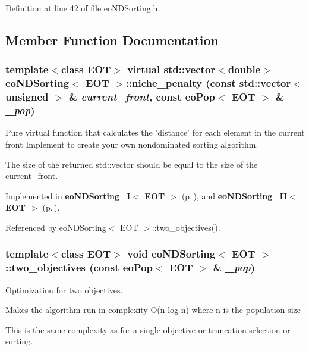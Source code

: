 Definition at line 42 of file eo\-NDSorting.h.

\subsection{Member Function Documentation}
\subsubsection{\setlength{\rightskip}{0pt plus 5cm}template$<$class EOT$>$ virtual std::vector$<$double$>$ {\bf eo\-NDSorting}$<$ {\bf EOT} $>$::niche\_\-penalty (const std::vector$<$ unsigned $>$ \& {\em current\_\-front}, const {\bf eo\-Pop}$<$ {\bf EOT} $>$ \& {\em \_\-pop})\hspace{0.3cm}{\tt  [pure virtual]}}\label{classeo_n_d_sorting_a2}


Pure virtual function that calculates the 'distance' for each element in the current front Implement to create your own nondominated sorting algorithm. 

The size of the returned std::vector should be equal to the size of the current\_\-front. 

Implemented in {\bf eo\-NDSorting\_\-I$<$ EOT $>$} {\rm (p.\,\pageref{classeo_n_d_sorting___i_a1})}, and {\bf eo\-NDSorting\_\-II$<$ EOT $>$} {\rm (p.\,\pageref{classeo_n_d_sorting___i_i_a1})}.

Referenced by eo\-NDSorting$<$ EOT $>$::two\_\-objectives().
\subsubsection{\setlength{\rightskip}{0pt plus 5cm}template$<$class EOT$>$ void {\bf eo\-NDSorting}$<$ {\bf EOT} $>$::two\_\-objectives (const {\bf eo\-Pop}$<$ {\bf EOT} $>$ \& {\em \_\-pop})\hspace{0.3cm}{\tt  [inline, private]}}\label{classeo_n_d_sorting_d1}


Optimization for two objectives. 

Makes the algorithm run in complexity O(n log n) where n is the population size

This is the same complexity as for a single objective or truncation selection or sorting.


